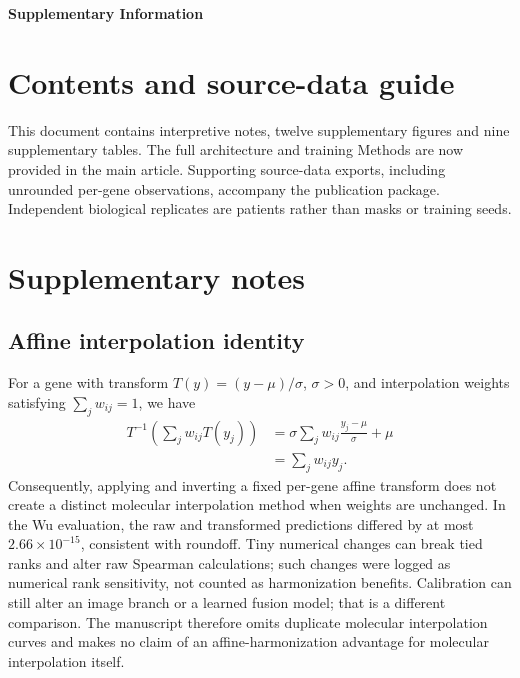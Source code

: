 
\begin{center}
{\Large\bfseries Supplementary Information\par}
\vspace{10pt}
{\large\bfseries \PaperTitle\par}
\vspace{12pt}
\AuthorNames\par
\AuthorAffiliations\par
\Correspondence\par
\end{center}
\section*{Contents and source-data guide}
This document contains interpretive notes, twelve supplementary figures and nine supplementary tables. The full architecture and training Methods are now provided in the main article. Supporting source-data exports, including unrounded per-gene observations, accompany the publication package. Independent biological replicates are patients rather than masks or training seeds.
\clearpage
\section{Supplementary notes}
\subsection{Affine interpolation identity}
For a gene with transform $T(y)=(y-\mu)/\sigma$, $\sigma>0$, and interpolation weights satisfying $\sum_j w_{ij}=1$, we have
\begin{align*}
T^{-1}\!\left(\sum_j w_{ij}T(y_j)\right)
&=\sigma\sum_jw_{ij}\frac{y_j-\mu}{\sigma}+\mu\\
&=\sum_j w_{ij}y_j.
\end{align*}
Consequently, applying and inverting a fixed per-gene affine transform does not create a distinct molecular interpolation method when weights are unchanged. In the Wu evaluation, the raw and transformed predictions differed by at most $2.66\times10^{-15}$, consistent with roundoff. Tiny numerical changes can break tied ranks and alter raw Spearman calculations; such changes were logged as numerical rank sensitivity, not counted as harmonization benefits. Calibration can still alter an image branch or a learned fusion model; that is a different comparison. The manuscript therefore omits duplicate molecular interpolation curves and makes no claim of an affine-harmonization advantage for molecular interpolation itself.

